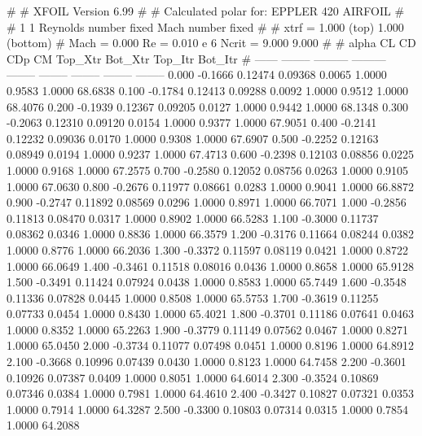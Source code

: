 #  
#       XFOIL         Version 6.99
#  
# Calculated polar for: EPPLER 420 AIRFOIL                              
#  
# 1 1 Reynolds number fixed          Mach number fixed         
#  
# xtrf =   1.000 (top)        1.000 (bottom)  
# Mach =   0.000     Re =     0.010 e 6     Ncrit =   9.000  9.000
#  
#   alpha    CL        CD       CDp       CM     Top_Xtr  Bot_Xtr  Top_Itr  Bot_Itr
#  ------ -------- --------- --------- -------- -------- -------- -------- --------
   0.000  -0.1666   0.12474   0.09368   0.0065   1.0000   0.9583   1.0000  68.6838
   0.100  -0.1784   0.12413   0.09288   0.0092   1.0000   0.9512   1.0000  68.4076
   0.200  -0.1939   0.12367   0.09205   0.0127   1.0000   0.9442   1.0000  68.1348
   0.300  -0.2063   0.12310   0.09120   0.0154   1.0000   0.9377   1.0000  67.9051
   0.400  -0.2141   0.12232   0.09036   0.0170   1.0000   0.9308   1.0000  67.6907
   0.500  -0.2252   0.12163   0.08949   0.0194   1.0000   0.9237   1.0000  67.4713
   0.600  -0.2398   0.12103   0.08856   0.0225   1.0000   0.9168   1.0000  67.2575
   0.700  -0.2580   0.12052   0.08756   0.0263   1.0000   0.9105   1.0000  67.0630
   0.800  -0.2676   0.11977   0.08661   0.0283   1.0000   0.9041   1.0000  66.8872
   0.900  -0.2747   0.11892   0.08569   0.0296   1.0000   0.8971   1.0000  66.7071
   1.000  -0.2856   0.11813   0.08470   0.0317   1.0000   0.8902   1.0000  66.5283
   1.100  -0.3000   0.11737   0.08362   0.0346   1.0000   0.8836   1.0000  66.3579
   1.200  -0.3176   0.11664   0.08244   0.0382   1.0000   0.8776   1.0000  66.2036
   1.300  -0.3372   0.11597   0.08119   0.0421   1.0000   0.8722   1.0000  66.0649
   1.400  -0.3461   0.11518   0.08016   0.0436   1.0000   0.8658   1.0000  65.9128
   1.500  -0.3491   0.11424   0.07924   0.0438   1.0000   0.8583   1.0000  65.7449
   1.600  -0.3548   0.11336   0.07828   0.0445   1.0000   0.8508   1.0000  65.5753
   1.700  -0.3619   0.11255   0.07733   0.0454   1.0000   0.8430   1.0000  65.4021
   1.800  -0.3701   0.11186   0.07641   0.0463   1.0000   0.8352   1.0000  65.2263
   1.900  -0.3779   0.11149   0.07562   0.0467   1.0000   0.8271   1.0000  65.0450
   2.000  -0.3734   0.11077   0.07498   0.0451   1.0000   0.8196   1.0000  64.8912
   2.100  -0.3668   0.10996   0.07439   0.0430   1.0000   0.8123   1.0000  64.7458
   2.200  -0.3601   0.10926   0.07387   0.0409   1.0000   0.8051   1.0000  64.6014
   2.300  -0.3524   0.10869   0.07346   0.0384   1.0000   0.7981   1.0000  64.4610
   2.400  -0.3427   0.10827   0.07321   0.0353   1.0000   0.7914   1.0000  64.3287
   2.500  -0.3300   0.10803   0.07314   0.0315   1.0000   0.7854   1.0000  64.2088
